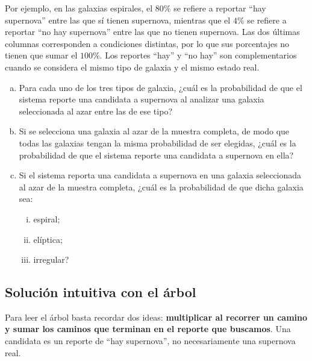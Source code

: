 \documentclass[a4paper]{article}
\begin{document}
Por ejemplo, en las galaxias espirales, el $80\%$ se refiere a reportar ``hay supernova'' entre las que sí tienen supernova, mientras que el $4\%$ se refiere a reportar ``no hay supernova'' entre las que no tienen supernova. Las dos últimas columnas corresponden a condiciones distintas, por lo que sus porcentajes no tienen que sumar el $100\%$. Los reportes ``hay'' y ``no hay'' son complementarios cuando se considera el mismo tipo de galaxia y el mismo estado real.



\begin{enumerate}[a)]
    \item Para cada uno de los tres tipos de galaxia, ¿cuál es la probabilidad de que el sistema reporte una candidata a supernova al analizar una galaxia seleccionada al azar entre las de ese tipo?
    \item Si se selecciona una galaxia al azar de la muestra completa, de modo que todas las galaxias tengan la misma probabilidad de ser elegidas, ¿cuál es la probabilidad de que el sistema reporte una candidata a supernova en ella?
    \item Si el sistema reporta una candidata a supernova en una galaxia seleccionada al azar de la muestra completa, ¿cuál es la probabilidad de que dicha galaxia sea:
    \begin{enumerate}[i.]
        \item espiral;
        \item elíptica;
        \item irregular?
    \end{enumerate}
\end{enumerate}

\subsection{Solución intuitiva con el árbol}

Para leer el árbol basta recordar dos ideas: \textbf{multiplicar al recorrer un camino y sumar los caminos que terminan en el reporte que buscamos}. Una candidata es un reporte de ``hay supernova'', no necesariamente una supernova real.
\end{document}
